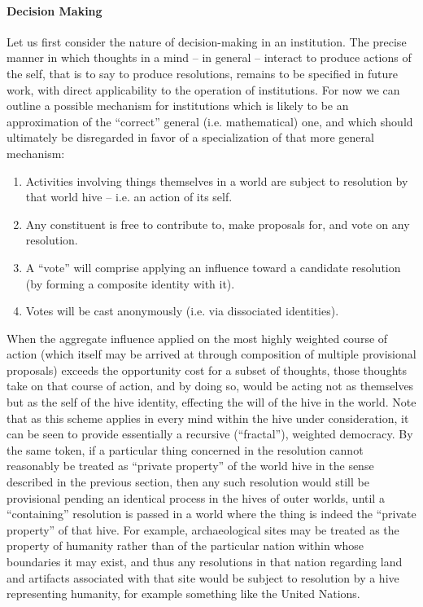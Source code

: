 \documentclass[pra,twocolumn,groupedaddress,10pt]{revtex4}
\theoremstyle{definition}
\begin{document}
\paragraph{Decision Making} Let us first consider the nature of decision-making in an institution. The precise manner in which thoughts in a mind -- in general -- interact to produce actions of the self, that is to say to produce resolutions, remains to be specified in future work, with direct applicability to the operation of institutions. For now we can outline a possible mechanism for institutions which is likely to be an approximation of the ``correct'' general (i.e. mathematical) one, and which should ultimately be disregarded in favor of a specialization of that more general mechanism:

\begin{enumerate}
	\item Activities involving things themselves in a world are subject to resolution by that world hive -- i.e. an action of its self.
	\item Any constituent is free to contribute to, make proposals for, and vote on any resolution.
	\item A ``vote'' will comprise applying an influence toward a candidate resolution (by forming a composite identity with it).
	\item Votes will be cast anonymously (i.e. via dissociated identities).
\end{enumerate}

When the aggregate influence applied on the most highly weighted course of action (which itself may be arrived at through composition of multiple provisional proposals) exceeds the opportunity cost for a subset of thoughts, those thoughts take on that course of action, and by doing so, would be acting not as themselves but as the self of the hive identity, effecting the will of the hive in the world. Note that as this scheme applies in every mind within the hive under consideration, it can be seen to provide essentially a recursive (``fractal''), weighted democracy. By the same token, if a particular thing concerned in the resolution cannot reasonably be treated as ``private property'' of the world hive in the sense described in the previous section, then any such resolution would still be provisional pending an identical process in the hives of outer worlds, until a ``containing'' resolution is passed in a world where the thing is indeed the ``private property'' of that hive. For example, archaeological sites may be treated as the property of humanity rather than of the particular nation within whose boundaries it may exist, and thus any resolutions in that nation regarding land and artifacts associated with that site would be subject to resolution by a hive representing humanity, for example something like the United Nations.
\end{document}
